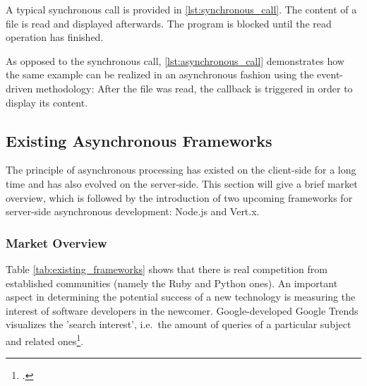 
A typical synchronous call is provided in \autoref{lst:synchronous_call}. The
content of a file is read and displayed afterwards. The program is blocked until the
read operation has finished.



As opposed to the synchronous call, \autoref{lst:asynchronous_call} demonstrates
how the same example can be realized in an asynchronous fashion using the event-driven
methodology: After the file was read, the callback is triggered in order to
display its content.






\subsection{Existing Asynchronous Frameworks}
\label{existing_frameworks}
The principle of asynchronous processing has existed on the client-side for a long time and has also evolved
on the server-side. This section will give a brief market overview, which is followed by the
introduction of two upcoming frameworks for server-side asynchronous
development: Node.js and Vert.x.


\subsubsection{Market Overview}
\label{frameworks_overview}
\FloatBarrier
Table \ref{tab:existing_frameworks} shows that there is real competition
from established communities (namely the Ruby and Python ones). An important
aspect in determining the potential success of a new technology is measuring the
interest of software developers in the newcomer. Google-developed Google Trends
visualizes the 'search interest', i.e.\ the amount of queries of a particular
subject and related ones\footcite[Cf.][]{g_trends}.


